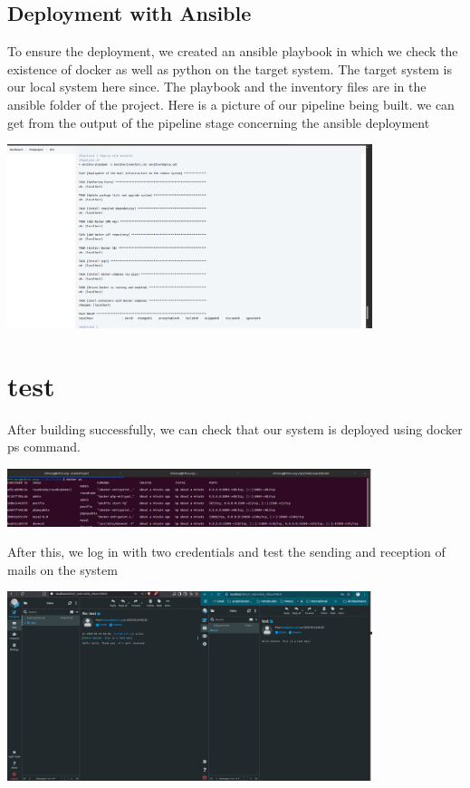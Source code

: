 \documentclass[12pt]{article}
\begin{document}
\subsection{Deployment with Ansible}
To ensure the deployment, we created an ansible playbook in which we check the existence of docker as well as python on the target system. The target system is our local system here since. The playbook and the inventory files are in the ansible folder of the project. 
Here is a picture of our pipeline being built. we can get from the output of the pipeline stage concerning the ansible deployment

\begin{center}
    \includegraphics[width=0.8\textwidth]{ansible.png}
     \label{ansible deployment.png}
\end{center}
\section{test}
After building successfully, we can check that our system is deployed using docker ps command. 
\begin{center}
    \includegraphics[width=0.8\textwidth]{dockerps.png}
     \label{dockerpss.png}
\end{center}
After this, we log in with two credentials and test the sending and reception of mails on the system

\begin{center}
    \includegraphics[width=0.8\textwidth]{test.png}
     \label{test.png}
\end{center}
\end{document}
